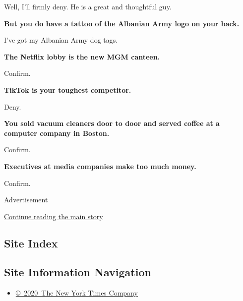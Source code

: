 Well, I'll firmly deny. He is a great and thoughtful guy.

\textbf{But you do have a tattoo of the Albanian Army logo on your
back.}

I've got my Albanian Army dog tags.

\textbf{The Netflix lobby is the new MGM canteen.}

Confirm.

\textbf{TikTok is your toughest competitor.}

Deny.

\textbf{You sold vacuum cleaners door to door and served coffee at a
computer company in Boston.}

Confirm.

\textbf{Executives at media companies make too much money.}

Confirm.

Advertisement

\protect\hyperlink{after-bottom}{Continue reading the main story}

\hypertarget{site-index}{%
\subsection{Site Index}\label{site-index}}

\hypertarget{site-information-navigation}{%
\subsection{Site Information
Navigation}\label{site-information-navigation}}

\begin{itemize}
\tightlist
\item
  \href{https://help.nytimes3xbfgragh.onion/hc/en-us/articles/115014792127-Copyright-notice}{©~2020~The
  New York Times Company}
\end{itemize}

